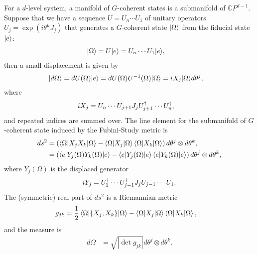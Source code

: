 For a $d$-level system, a manifold of $G$-coherent states is a submanifold of $\mathbb{C}P^{d-1}$.
Suppose that we have a sequence $U=U_n \cdots U_1$ of unitary operators $U_j = \exp(i\theta^{\mu} J_j)$ that generates a $G$-coherent state ${\left\vert{\Omega}\right\rangle}$ from the fiducial state ${\left\vert{e}\right\rangle}$:
\begin{align}
	{\left\vert{\Omega}\right\rangle} &= U{\left\vert{e}\right\rangle} = U_n \cdots U_1 {\left\vert{e}\right\rangle},
\end{align}
then a small displacement is given by
\begin{align}
{\left\vert{d\Omega}\right\rangle} &= dU(\Omega) {\left\vert{e}\right\rangle} = dU(\Omega) U^{-1}(\Omega) {\left\vert{\Omega}\right\rangle}
= iX_j {\left\vert{\Omega}\right\rangle} d\theta^j,
\end{align}
where
\begin{align}
i X_j &= U_n \cdots U_{j+1} J_j U_{j+1}^{\dagger} \cdots U_n^{\dagger},
\end{align}
and repeated indices are summed over.
The line element for the submanifold of $G$-coherent state induced by the Fubini-Study metric is
\begin{align}
ds^2 &= \left( \braket{\Omega |X_{j} X_{k}| \Omega} - \braket{\Omega | X_{j} | \Omega} \braket{\Omega | X_{k} | \Omega} \right) d\theta^{j} \otimes d\theta^{k}, \\
	&=  \left( \braket{e|Y_{j}(\Omega) Y_{k}(\Omega)|e} - \braket{e| Y_{j}(\Omega) |e} \braket{e| Y_{k}(\Omega) |e} \right) d\theta^{j} \otimes d\theta^{k},
\end{align}
where $Y_{j}(\Omega)$ is the displaced generator
\begin{align}
i Y_{j} = U_1^{\dagger} \cdots U_{j-1}^{\dagger} J_{j} U_{j-1} \cdots U_1.
\end{align}
The (symmetric) real part of $ds^2$ is a Riemannian metric
\begin{align}
	g_{jk} &= \frac{1}{2} \braket{\Omega | \{X_j, X_k\} | \Omega} - \braket{\Omega | X_j | \Omega} \braket{\Omega | X_k | \Omega},
\end{align}
and the measure is
\begin{align}
	d\Omega &= \sqrt{|\det g_{jk}|} d\theta^j \otimes d\theta^k.
\end{align}



